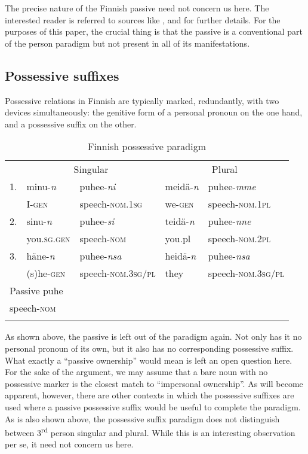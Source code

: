 \documentclass[output=paper, colorlinks,citecolor=brown]{langsci/langscibook}
\begin{document}
The precise nature of the Finnish passive need not concern us here. The interested reader is referred to sources like \citet{Shore1988}, \citet{ManninenNelson2004} and \citet{Helasvuo2006} for further details. For the purposes of this paper, the crucial thing is that the passive is a conventional part of the person paradigm but not present in all of its manifestations.

\subsection{Possessive suffixes}\label{sec:leino_4.2}

Possessive relations in Finnish are typically marked, redundantly, with two devices simultaneously: the genitive form of a personal pronoun on the one hand, and a possessive suffix on the other.

\begin{table}
    \caption{Finnish possessive paradigm\label{tab:leino:2}}
    \begin{tabular}{l ll ll}
        \lsptoprule
            & \multicolumn{2}{c}{Singular} & \multicolumn{2}{c}{Plural}\\\cmidrule(lr){2-3}\cmidrule(lr){4-5}
            {1.} &  minu-\textit{n} & puhee-\textit{ni}  &  meidä-\textit{n} &  puhee-\textit{mme}\\
                 & I-\textsc{gen} & speech-\textsc{nom.1sg}  &   we-\textsc{gen} & speech-\textsc{nom.1pl}\\
            {2.} &  sinu-\textit{n} & puhee-\textit{si}  &  teidä-\textit{n} & puhee-\textit{nne}\\     
                 & you.\textsc{sg.gen} & speech-\textsc{nom}  & you.pl & speech-\textsc{nom.2pl}\\
            {3.} & häne-\textit{n} & puhee-\textit{nsa}  &  heidä-\textit{n} & puhee-\textit{nsa}\\
                 & (s)he-\textsc{gen} &  speech-\textsc{nom.3sg/pl} & they & speech-\textsc{nom.3sg/pl}\\\midrule
            \multicolumn{5}{l}{Passive \hfill puhe\hfill}\\
            \multicolumn{5}{l}{\hphantom{Passive} \hfill speech-\textsc{nom} \hfill}\\
        \lspbottomrule
    \end{tabular}
\end{table}

        

As shown above, the passive is left out of the paradigm again. Not only has it no personal pronoun of its own, but it also has no corresponding possessive suffix. What exactly a “passive ownership” would mean is left an open question here. For the sake of the argument, we may assume that a bare noun with no possessive marker is the closest match to “impersonal ownership”. As will become apparent, however, there are other contexts in which the possessive suffixes are used where a passive possessive suffix would be useful to complete the paradigm. As is also shown above, the possessive suffix paradigm does not distinguish between 3\textsuperscript{rd} person singular and plural. While this is an interesting observation per se, it need not concern us here.\largerpage
\end{document}
